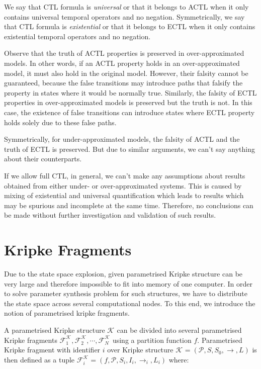 \documentclass[12pt,oneside,draft]{fithesis2}
\newcommand{\ks}[1][]{\ensuremath{\mathcal{K}_{#1}}}
\newcommand{\kf}[2]{\ensuremath{\mathcal{F}^{#2}_{#1}}}
\newcommand{\fullKs}{\ensuremath{ \ks = (\params, S, S_0, \trans{}, L) }}
\newcommand{\fullKf}[2]{\ensuremath{ \kf{#1}{#2} = (f, \params, S_{#1}, I_{i}, \trans{}_{#1}, L_{#1}) }}
\newcommand{\trans}[1]{\stackrel{#1}{\rightarrow}}
\newcommand{\params}{\mathcal{P}}
\begin{document}
			We say that CTL formula is \emph{universal} or that it belongs to ACTL when it only contains universal temporal operators and no negation. Symmetrically, we say that CTL formula is \emph{existential} or that it belongs to ECTL when it only contains existential temporal operators and no negation.
			
			Observe that the truth of ACTL properties is preserved in over-approximated models. In other words, if an ACTL property holds in an over-approximated model, it must also hold in the original model. However, their falsity cannot be guaranteed, because the false transitions may introduce paths that falsify the property in states where it would be normally true. Similarly, the falsity of ECTL properties in over-approximated models is preserved but the truth is not. In this case, the existence of false transitions can introduce states where ECTL property holds solely due to these false paths.
			
			Symmetrically, for under-approximated models, the falsity of ACTL and the truth of ECTL is preserved. But due to similar arguments, we can't say anything about their counterparts.
			
			If we allow full CTL, in general, we can't make any assumptions about results obtained from either under- or over-approximated systems. This is caused by mixing of existential and universal quantification which leads to results which may be spurious and incomplete at the same time. Therefore, no conclusions can be made without further investigation and validation of such results.
			
		\section{Kripke Fragments}
		
			Due to the state space explosion, given parametrised Kripke structure can be very large and therefore impossible to fit into memory of one computer. In order to solve parameter synthesis problem for such structures, we have to distribute the state space across several computational nodes. To this end, we introduce the notion of parametrised kripke fragments.
			
			A parametrised Kripke structure $\ks$ can be divided into several parametrised Kripke fragments $\kf{1}{\ks}, \kf{2}{\ks}, \cdots , \kf{N}{\ks}$ using a partition function $f$. Parametrised Kripke fragment with identifier $i$ over Kripke structure $\fullKs$ is then defined as a tuple $\fullKf{i}{\ks}$ where:
			
\end{document}
